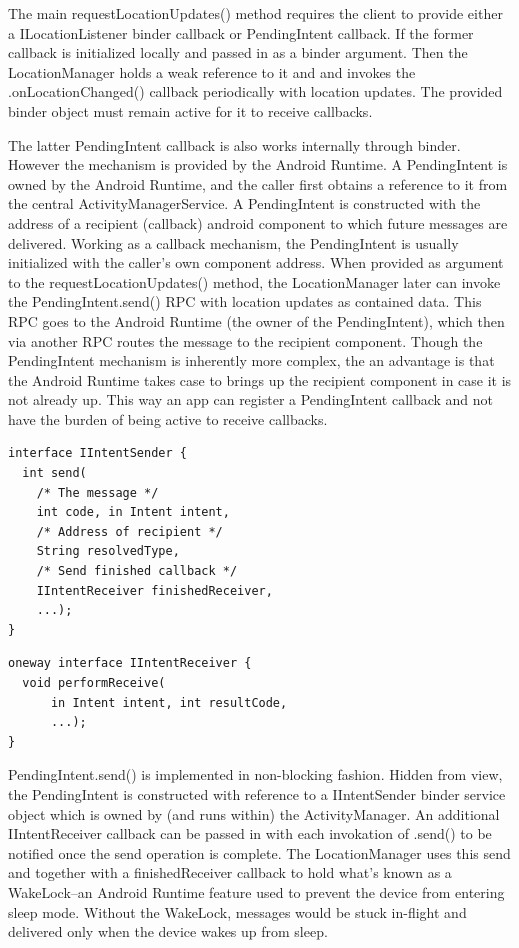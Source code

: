\documentclass[prodmode]{acmlarge}
\begin{document}
The main requestLocationUpdates() method requires the client to provide either a ILocationListener binder callback or PendingIntent callback. If the former callback is initialized locally and passed in as a binder argument. Then the LocationManager holds a weak reference to it and and invokes the .onLocationChanged() callback periodically with location updates. The provided binder object must remain active for it to receive callbacks.

The latter PendingIntent callback is also works internally through binder. However the mechanism is provided by the Android Runtime. A PendingIntent is owned by the Android Runtime, and the caller first obtains a reference to it from the central ActivityManagerService. A PendingIntent is constructed with the address of a recipient (callback) android component to which future messages are delivered. Working as a callback mechanism, the PendingIntent is usually initialized with the caller's own component address. When provided as argument to the requestLocationUpdates() method, the LocationManager later can invoke the PendingIntent.send() RPC with location updates as contained data. This RPC goes to the Android Runtime (the owner of the PendingIntent), which then via another RPC routes the message to the recipient component. Though the PendingIntent mechanism is inherently more complex, the an advantage is that the Android Runtime takes case to brings up the recipient component in case it is not already up. This way an app can register a PendingIntent callback and not have the burden of being active to receive callbacks.

\begin{Verbatim}[samepage=true]
interface IIntentSender {
  int send(
    /* The message */
    int code, in Intent intent,
    /* Address of recipient */
    String resolvedType,
    /* Send finished callback */
    IIntentReceiver finishedReceiver,
    ...);
}
\end{Verbatim}

\begin{Verbatim}[samepage=true]
oneway interface IIntentReceiver {
  void performReceive(
      in Intent intent, int resultCode,
      ...);
}
\end{Verbatim}

PendingIntent.send() is implemented in non-blocking fashion. Hidden from view, the PendingIntent is constructed with reference to a IIntentSender binder service object which is owned by (and runs within) the ActivityManager. An additional IIntentReceiver callback can be passed in with each invokation of .send() to be notified once the send operation is complete. The LocationManager uses this send and together with a finishedReceiver callback to hold what's known as a WakeLock--an Android Runtime feature used to prevent the device from entering sleep mode. Without the WakeLock, messages would be stuck in-flight and delivered only when the device wakes up from sleep.
\end{document}
